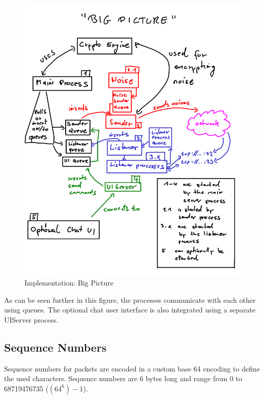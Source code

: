 \begin{figure}[htbp][htb]
\caption{Implementation: Big Picture}
\label{bigpicture}
\includegraphics[scale=0.8]{bigpicture.png}
\end{figure}
As can be seen further in this figure, the processes communicate with
each other using queues. The optional chat user interface is also
integrated using a separate UIServer process.
\subsection{Sequence Numbers}
Sequence numbers for packets are encoded in a custom base 64 encoding to
define the used characters. Sequence numbers are 6 bytes
long and range from 0 to 68719476735 ($(64^6)-1$).

